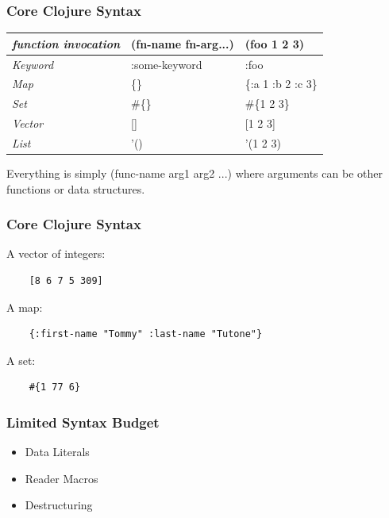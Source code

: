 \documentclass{beamer}
\begin{document}
% 
\begin{frame}
  \frametitle{Core Clojure Syntax}
  \begin{tabularx}{\textwidth}{ |X|X|X| }
    \hline
    \emph{function invocation} & (fn-name fn-arg...)  &  (foo 1 2 3) \\ 
    \hline
    \emph{Keyword} & :some-keyword  & :foo \\ 
    \hline
    \emph{Map} &    \{\}  & \{:a 1 :b 2 :c 3\} \\ 
    \hline
    \emph{Set} &    \#\{\} & \#\{1 2 3\} \\ 
    \hline
    \emph{Vector} & []  & [1 2 3] \\
    \hline
    \emph{List} & '() & '(1 2 3) \\
    \hline
  \end{tabularx}

  \vspace{.5cm}
  Everything is simply (func-name arg1 arg2 ...) where arguments can
  be other functions or data structures. 
\end{frame}

\begin{frame}[fragile]
\frametitle{Core Clojure Syntax}
A vector of integers:
  \begin{verbatim}
    [8 6 7 5 309]
  \end{verbatim}
A map:
  \begin{verbatim}
    {:first-name "Tommy" :last-name "Tutone"}
  \end{verbatim}
A set:
  \begin{verbatim}
    #{1 77 6}
  \end{verbatim}

\end{frame}


\begin{frame}
  \frametitle{Limited Syntax Budget}
  \begin{itemize}
  \item Data Literals 
  \item Reader Macros
  \item Destructuring
  \end{itemize}
\end{frame}
\end{document}
